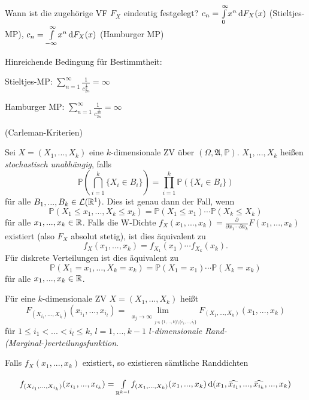 \documentclass{cheat-sheet}
\newcommand{\Alg}{\mathfrak{A}} %
\renewcommand{\P}{\mathbb{P}} %
\begin{document}
\begin{problem}
  Wann ist die zugehörige VF $F_X$ eindeutig festgelegt? $c_n = {\textstyle \int\limits_{0}^{\infty}} x^n \,\mathrm{d} F_X(x)$ (Stieltjes-MP), $c_n = {\textstyle \int\limits_{-\infty}^{\infty}} x^n \,\mathrm{d} F_X(x)$ (Hamburger MP)

  Hinreichende Bedingung für Bestimmtheit:

  Stieltjes-MP: $\sum_{n=1}^\infty \frac{1}{c_{2n}^{\tfrac{1}{n}}} = \infty$

  Hamburger MP: $\sum_{n=1}^\infty \frac{1}{c_{2n}^{\tfrac{1}{2n}}} = \infty$

  (Carleman-Kriterien)
\end{problem}




\begin{defn}
  Sei $X = (X_1, ..., X_k)$ eine $k$-dimensionale ZV über $(\Omega, \Alg, \P)$. $X_1, ..., X_k$ heißen \emph{stochastisch unabhängig}, falls
  \[ \P(\bigcap_{i=1}^k \{ X_i \in B_i \}) = \prod_{i=1}^k \P(\{ X_i \in B_i \}) \]
  für alle $B_1, ..., B_k \in \mathcal{L}(\mathbb{R}^1)$. Dies ist genau dann der Fall, wenn
  \[ \P(X_1 \leq x_1, ..., X_k \leq x_k) = \P(X_1 \leq x_1) \cdots \P(X_k \leq X_k) \]
  für alle $x_1, ..., x_k \in \mathbb{R}$. Falls die W-Dichte $f_X(x_1, ..., x_k) = \tfrac{\partial}{\partial x_1 \cdots \partial x_k} F(x_1, ..., x_k)$ existiert (also $F_X$ absolut stetig), ist dies äquivalent zu
  \[ f_X(x_1, ..., x_k) = f_{X_1}(x_1) \cdots f_{X_k}(x_k). \]
  Für diskrete Verteilungen ist dies äquivalent zu
  \[ \P(X_1 = x_1, ..., X_k = x_k) = \P(X_1 = x_1) \cdots \P(X_k = x_k) \]
  für alle $x_1, ..., x_k \in \mathbb{R}$.
\end{defn}

\begin{defn}
  Für eine $k$-dimensionale ZV $X = (X_1, ..., X_k)$ heißt
  \[ F_{(X_{i_1}, ..., X_{i_l})}(x_{i_1}, ..., x_{i_l}) = \lim_{\substack{x_j \to \infty}_{j \in \{ 1, ..., k\} \setminus \{ i_1, ..., i_l \}}} F_(X_1, ..., X_k)(x_1, ..., x_k) \]
  für $1 \leq i_1 < ... < i_l \leq k$, $l = 1, ..., k-1$ \emph{$l$-dimensionale Rand-(Marginal-)verteilungsfunktion}.
\end{defn}

Falls $f_X(x_1, ..., x_k)$ existiert, so existieren sämtliche Randdichten

\[ f_{(X_{i_1}, ..., X_{i_k})}(x_{i_1}, ..., x_{i_k}) = {\textstyle \int\limits_{\mathbb{R}^{k-l}}^{}} f_{(X_1, ..., X_k)}(x_1, ..., x_k) \,\mathrm{d} (x_1, \widehat{x_{i_1}}, ..., \widehat{x_{i_k}}, ..., x_k) \]
\end{document}

